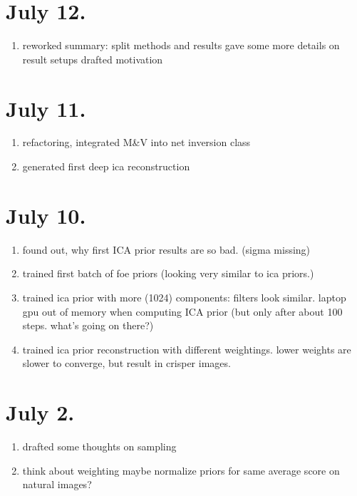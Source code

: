 \documentclass{article}
\begin{document}
\section*{July 12.}

\begin{enumerate}
	\item reworked summary:
	\subitem split methods and results
	\subitem gave some more details on result setups
	\subitem drafted motivation
\end{enumerate}

\section*{July 11.}

\begin{enumerate}
	\item refactoring, integrated M\&V into net inversion class
	\item generated first deep ica reconstruction
\end{enumerate}

\section*{July 10.}

\begin{enumerate}
	\item found out, why first ICA prior results are so bad. (sigma missing)
	\item trained first batch of foe priors (looking very similar to ica priors.)
	\item trained ica prior with more (1024) components: filters look similar. laptop gpu out of memory when computing ICA prior (but only after about 100 steps. what's going on there?)
	\item trained ica prior reconstruction with different weightings. lower weights are slower to converge, but result in crisper images.
\end{enumerate}


\section*{July 2.}

\begin{enumerate}
	\item drafted some thoughts on sampling
	\item think about weighting maybe normalize priors for same average score on natural images?
\end{enumerate}
\end{document}

